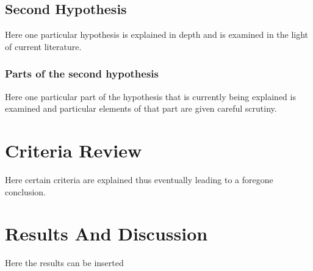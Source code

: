 
\subsection{Second Hypothesis}

Here one particular hypothesis is explained in depth
and is examined in the light of current literature.

\subsubsection{Parts of the second hypothesis}

Here one particular part of the hypothesis that is
currently being explained is examined and particular
elements of that part are given careful scrutiny.

\section{Criteria Review}

Here certain criteria are explained thus eventually
leading to a foregone conclusion.

\section{Results And Discussion}

Here the results can be inserted

